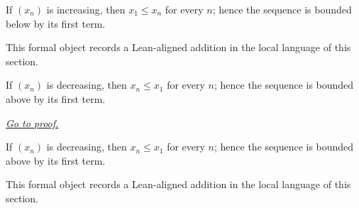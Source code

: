 \begin{remark*}
If $(x_n)$ is increasing, then $x_1\le x_n$ for every $n$; hence the sequence is bounded below by its first term.
\end{remark*}

\begin{remark*}[Interpretation]
This formal object records a Lean-aligned addition in the local language of this section.
\end{remark*}

\begin{dependencies}
\NoLocalDependencies
\end{dependencies}
\begin{theorem}
\label{thm:decreasing-bounded-above-by-first-term}
If $(x_n)$ is decreasing, then $x_n\le x_1$ for every $n$; hence the sequence is bounded above by its first term.

\smallskip
\noindent
\hyperref[prf:decreasing-bounded-above-by-first-term]{\textit{Go to proof.}}
\end{theorem}

\begin{remark*}
If $(x_n)$ is decreasing, then $x_n\le x_1$ for every $n$; hence the sequence is bounded above by its first term.
\end{remark*}

\begin{remark*}[Interpretation]
This formal object records a Lean-aligned addition in the local language of this section.
\end{remark*}

\begin{dependencies}
\NoLocalDependencies
\end{dependencies}
